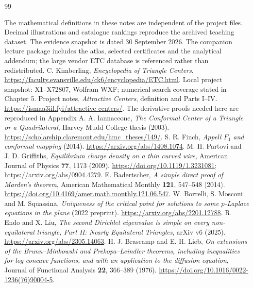 \documentclass[11pt,oneside,openany]{book}
\begin{document}
\backmatter

\renewcommand{\bibname}{References and research record}
\begin{thebibliography}{99}
\item[] The mathematical definitions in these notes are independent of the
project files. Decimal illustrations and catalogue rankings reproduce
the archived teaching dataset. The evidence snapshot is dated
30 September 2026. The companion lecture package includes the atlas,
selected certificates and the analytical addendum; the large vendor
ETC database is referenced rather than redistributed.
 C. Kimberling, \emph{Encyclopedia of Triangle Centers}.
\url{https://faculty.evansville.edu/ck6/encyclopedia/ETC.html}.
Local project snapshot: X1--X72807, Wolfram WXF; numerical search
coverage stated in Chapter 5.
 Project notes, \emph{Attractive Centers},
definition and Parts I--IV.
\url{https://ismaa3iil.fyi/attractive-centers/}.
The derivative proofs needed here are reproduced in Appendix A.
 A. Iannaccone,
\emph{The Conformal Center of a Triangle or a Quadrilateral},
Harvey Mudd College thesis (2003).
\url{https://scholarship.claremont.edu/hmc_theses/149/}.
 S. R. Finch, \emph{Appell $F_1$ and conformal mapping}
(2014). \url{https://arxiv.org/abs/1408.1074}.
 M. H. Partovi and J. D. Griffiths,
\emph{Equilibrium charge density on a thin curved wire},
American Journal of Physics \textbf{77}, 1173 (2009).
\url{https://doi.org/10.1119/1.3231081};
\url{https://arxiv.org/abs/0904.4279}.
 E. Badertscher, \emph{A simple direct proof of Marden's
theorem}, American Mathematical Monthly \textbf{121}, 547--548 (2014).
\url{https://doi.org/10.4169/amer.math.monthly.121.06.547}.
 W. Borrelli, S. Mosconi and M. Squassina,
\emph{Uniqueness of the critical point for solutions to some
$p$-Laplace equations in the plane} (2022 preprint).
\url{https://arxiv.org/abs/2201.12788}.
 R. Endo and X. Liu, \emph{The second Dirichlet eigenvalue
is simple on every non-equilateral triangle, Part II: Nearly
Equilateral Triangles}, arXiv v6 (2025).
\url{https://arxiv.org/abs/2305.14063}.
 H. J. Brascamp and E. H. Lieb,
\emph{On extensions of the Brunn--Minkowski and Prekopa--Leindler
theorems, including inequalities for log concave functions, and with
an application to the diffusion equation},
Journal of Functional Analysis \textbf{22}, 366--389 (1976).
\url{https://doi.org/10.1016/0022-1236(76)90004-5}.

\end{thebibliography}
\end{document}
